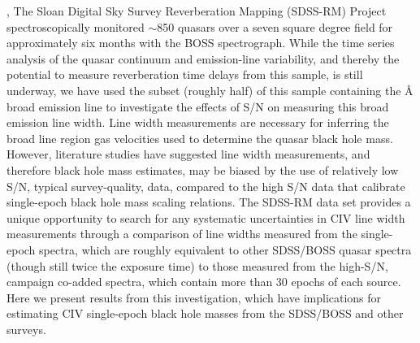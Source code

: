 \documentclass[a4paper,fleqn,usenatbib]{mnras}
\begin{document}
\citet{Denney2015}, 
The Sloan Digital Sky Survey Reverberation Mapping (SDSS-RM) Project
spectroscopically monitored $\sim$850 quasars over a seven square
degree field for approximately six months with the BOSS
spectrograph. While the time series analysis of the quasar continuum
and emission-line variability, and thereby the potential to measure
reverberation time delays from this sample, is still underway, we have
used the subset (roughly half) of this sample containing the \AA 
broad emission line to investigate the effects of S/N on measuring
this broad emission line width. Line width measurements are necessary
for inferring the broad line region gas velocities used to determine
the quasar black hole mass. However, literature studies have suggested
line width measurements, and therefore black hole mass estimates, may
be biased by the use of relatively low S/N, typical survey-quality,
data, compared to the high S/N data that calibrate single-epoch black
hole mass scaling relations. The SDSS-RM data set provides a unique
opportunity to search for any systematic uncertainties in CIV line
width measurements through a comparison of line widths measured from
the single-epoch spectra, which are roughly equivalent to other
SDSS/BOSS quasar spectra (though still twice the exposure time) to
those measured from the high-S/N, campaign co-added spectra, which
contain more than 30 epochs of each source. Here we present results
from this investigation, which have implications for estimating CIV
single-epoch black hole masses from the SDSS/BOSS and other surveys.
\end{document}
